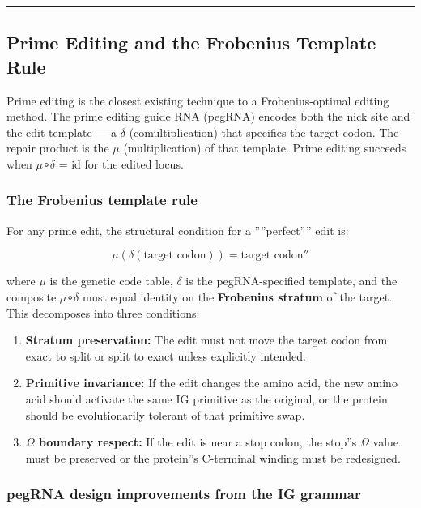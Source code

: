 \documentclass[12pt,a4paper]{article}
\begin{document}
\begin{center}
\rule{0.5\textwidth}{0.4pt}
\end{center}

\subsection{Prime Editing and the Frobenius Template Rule}

Prime editing is the closest existing technique to a Frobenius-optimal editing method. The prime editing guide RNA (pegRNA) encodes both the nick site and the edit template --- a $\delta$ (comultiplication) that specifies the target codon. The repair product is the $\mu$ (multiplication) of that template. Prime editing succeeds when $\mu$∘$\delta$ = id for the edited locus.

\subsubsection{The Frobenius template rule}

For any prime edit, the structural condition for a ''''perfect'''' edit is:

\[\mu(\delta(\text{target codon})) = \text{target codon}''\]

where $\mu$ is the genetic code table, $\delta$ is the pegRNA-specified template, and the composite $\mu$∘$\delta$ must equal identity on the \textbf{Frobenius stratum} of the target. This decomposes into three conditions:

\begin{enumerate}
    \item \textbf{Stratum preservation:} The edit must not move the target codon from exact to split or split to exact unless explicitly intended.
    \item \textbf{Primitive invariance:} If the edit changes the amino acid, the new amino acid should activate the same IG primitive as the original, or the protein should be evolutionarily tolerant of that primitive swap.
    \item \textbf{$\Omega$ boundary respect:} If the edit is near a stop codon, the stop''s $\Omega$ value must be preserved or the protein''s C-terminal winding must be redesigned.
\end{enumerate}

\subsubsection{pegRNA design improvements from the IG grammar}
\end{document}
